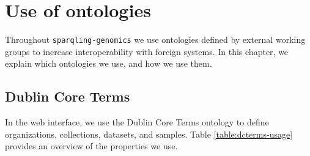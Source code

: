 \chapter{Use of ontologies}
\label{chap:implemented-ontologies}

  Throughout \texttt{sparqling-genomics} we use ontologies defined by external
  working groups to increase interoperability with foreign systems.  In this
  chapter, we explain which ontologies we use, and how we use them.

\section{Dublin Core Terms}

  In the web interface, we use the Dublin Core Terms ontology \citep{dcmi-terms}
  to define organizations, collections, datasets, and samples.  Table
  \ref{table:dcterms-usage} provides an overview of the properties we use.

